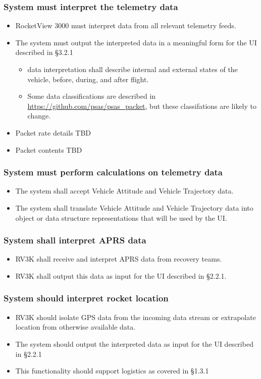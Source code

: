 \subsubsection{System must interpret the telemetry data}
  \begin{itemize}
    \item RocketView 3000 must interpret data from all relevant telemetry feeds.
    \item The system must output the interpreted data in a meaningful form for the UI described in \S 3.2.1
    \begin{itemize}
      \item data interpretation shall describe internal and external states of the vehicle, before, during, and after flight.
      \item Some data classifications are described in \url{https://github.com/psas/psas_packet}, but these classifations are likely to change.
    \end{itemize}
    \item Packet rate details TBD
    \item Packet contents TBD
  \end{itemize}

\subsubsection{System must perform calculations on telemetry data}
  \begin{itemize}
    \item The system shall accept Vehicle Attitude and Vehicle Trajectory data.
    \item The system shall translate Vehicle Attitude and Vehicle Trajectory data into object or data structure representations that will be used by the UI.
  \end{itemize}

\subsubsection{System shall interpret APRS data}
  \begin{itemize}
    \item RV3K shall receive and interpret APRS data from recovery teams.
    \item RV3K shall output this data as input for the UI described in \S 2.2.1.
  \end{itemize}

\subsubsection{System should interpret rocket location}
  \begin{itemize}
    \item RV3K should isolate GPS data from the incoming data stream or extrapolate location from otherwise available data.
    \item The system should output the interpreted data as input for the UI described in \S 2.2.1
    \item This functionality should support logistics as covered in \S 1.3.1
  \end{itemize}
